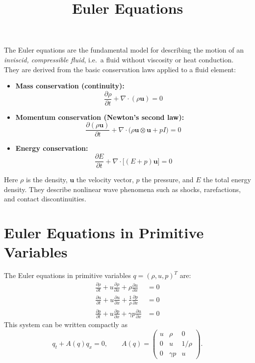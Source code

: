 \documentclass{article}
\title{Euler Equations}
\begin{document}
\maketitle

The Euler equations are the fundamental model for describing the motion of an
\emph{inviscid, compressible fluid}, i.e.\ a fluid without viscosity or heat conduction.  
They are derived from the basic conservation laws applied to a fluid element:

\begin{itemize}
  \item \textbf{Mass conservation (continuity):}
  \[
  \frac{\partial \rho}{\partial t} + \nabla \cdot (\rho \mathbf{u}) = 0
  \]

  \item \textbf{Momentum conservation (Newton's second law):}
  \[
  \frac{\partial (\rho \mathbf{u})}{\partial t} 
  + \nabla \cdot \big(\rho \mathbf{u} \otimes \mathbf{u} + p I \big) = 0
  \]

  \item \textbf{Energy conservation:}
  \[
  \frac{\partial E}{\partial t} 
  + \nabla \cdot \big[(E+p)\mathbf{u}\big] = 0
  \]
\end{itemize}
Here $\rho$ is the density, $\mathbf{u}$ the velocity vector, $p$ the pressure, and $E$ the total energy density. They describe nonlinear wave phenomena such as shocks, rarefactions, and contact discontinuities. 

\section*{Euler Equations in Primitive Variables}

The Euler equations in primitive variables $q = (\rho, u, p)^T$ are:
\begin{align}
\frac{\partial \rho}{\partial t} + u \frac{\partial \rho}{\partial x} + \rho \frac{\partial u}{\partial x} &= 0 \label{eq:euler1} \\[6pt]
\frac{\partial u}{\partial t} + u \frac{\partial u}{\partial x} + \frac{1}{\rho} \frac{\partial p}{\partial x} &= 0 \label{eq:euler2} \\[6pt]
\frac{\partial p}{\partial t} + u \frac{\partial p}{\partial x} + \gamma p \frac{\partial u}{\partial x} &= 0 \label{eq:euler3}
\end{align}
This system can be written compactly as
\begin{equation}
q_t + A(q) q_x = 0, 
\qquad 
A(q) =
\begin{pmatrix}
u & \rho & 0 \\
0 & u & 1/\rho \\
0 & \gamma p & u
\end{pmatrix}.
\end{equation}
\end{document}
